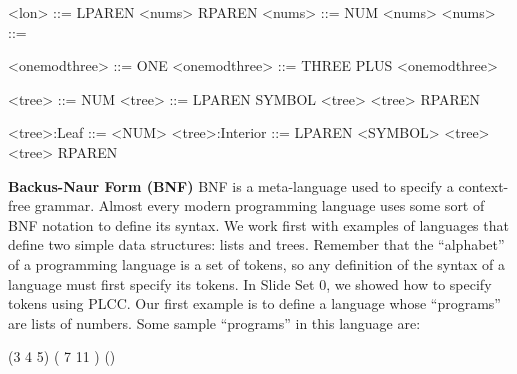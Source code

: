 \begin{minipage}[t]{\sw}
\slidenumber
\begin{SaveVerbatim}{\MYlon}
<lon>  ::= LPAREN <nums> RPAREN
<nums> ::= NUM <nums>
<nums> ::=
\end{SaveVerbatim}
\begin{SaveVerbatim}{\MYonemodthree}
<onemodthree>  ::= ONE
<onemodthree>  ::= THREE PLUS <onemodthree>
\end{SaveVerbatim}
\begin{SaveVerbatim}{\MYtree}
<tree>  ::= NUM
<tree>  ::= LPAREN SYMBOL <tree> <tree> RPAREN
\end{SaveVerbatim}
\begin{SaveVerbatim}{\MYtreeTOK}
<tree>:Leaf     ::= <NUM>
<tree>:Interior ::= LPAREN <SYMBOL> <tree> <tree> RPAREN
\end{SaveVerbatim}
\LARGE
{\bf Backus-Naur Form (BNF)}\exx
BNF is a meta-language used
to specify a context-free grammar.
Almost every modern programming language uses some sort
of BNF notation to define its syntax.
We work first with examples of languages
that define two simple data structures:
lists and trees.
Remember that the ``alphabet'' of a programming language
is a set of tokens,
so any definition of the syntax of a language
must first specify its tokens.
In Slide Set 0, we showed how to specify tokens using PLCC.\exx
Our first example is to define a language whose ``programs''
are lists of numbers.
Some sample ``programs'' in this language are:
\begin{qv}
(3 4 5)
(    7 11  )
()
\end{qv}
\end{minipage}
\clearpage
